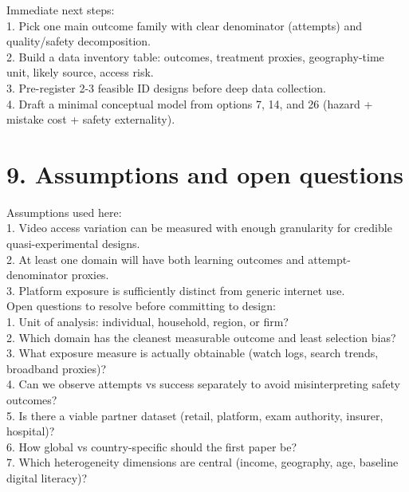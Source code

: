 \documentclass[11pt]{article}
\begin{document}
Immediate next steps:\\
1. Pick one main outcome family with clear denominator (attempts) and quality/safety decomposition.\\
2. Build a data inventory table: outcomes, treatment proxies, geography-time unit, likely source, access risk.\\
3. Pre-register 2-3 feasible ID designs before deep data collection.\\
4. Draft a minimal conceptual model from options 7, 14, and 26 (hazard + mistake cost + safety externality).\\

\section*{9. Assumptions and open questions}
Assumptions used here:\\
1. Video access variation can be measured with enough granularity for credible quasi-experimental designs.\\
2. At least one domain will have both learning outcomes and attempt-denominator proxies.\\
3. Platform exposure is sufficiently distinct from generic internet use.\\

Open questions to resolve before committing to design:\\
1. Unit of analysis: individual, household, region, or firm?\\
2. Which domain has the cleanest measurable outcome and least selection bias?\\
3. What exposure measure is actually obtainable (watch logs, search trends, broadband proxies)?\\
4. Can we observe attempts vs success separately to avoid misinterpreting safety outcomes?\\
5. Is there a viable partner dataset (retail, platform, exam authority, insurer, hospital)?\\
6. How global vs country-specific should the first paper be?\\
7. Which heterogeneity dimensions are central (income, geography, age, baseline digital literacy)?\\
\end{document}
